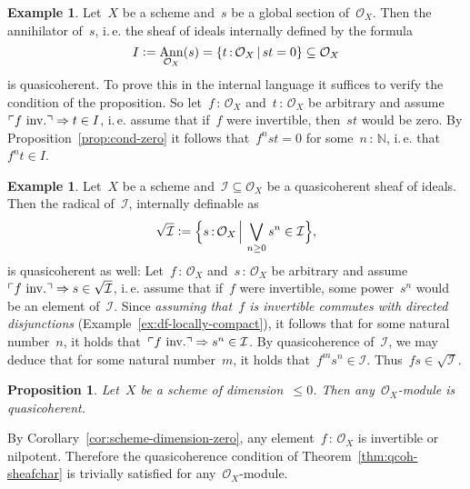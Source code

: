 \documentclass[10pt,reqno,a4paper]{amsbook}
\makeatletter
\theoremstyle{definition}
\newtheorem{ex}[defn]{Example}
\theoremstyle{plain}
\newtheorem{prop}[defn]{Proposition}
\theoremstyle{remark}
\newcommand{\A}{\mathcal{A}}
\renewcommand{\O}{\mathcal{O}}
\newcommand{\I}{\mathcal{I}}
\newcommand{\NN}{\mathbb{N}}
\DeclareMathOperator{\Ann}{Ann}
\newcommand{\?}{\,{:}\,}
\renewcommand{\_}{\mathpunct{.}\,}
\newcommand{\speak}[1]{\ulcorner\text{\textnormal{#1}}\urcorner}
\newcommand{\ie}{i.\,e.\@\xspace}
\newcommand{\inv}{inv.\@}
\newcommand{\defeq}{\vcentcolon=}
\renewenvironment{proof}[1][\proofname]{\par
  \pushQED{\qed}%
  \normalfont \topsep6\p@\@plus6\p@\relax
  \trivlist
  \item[\hskip\labelsep
        \itshape
    #1\@addpunct{.}]\ignorespaces
}{%
  \popQED\endtrivlist\@endpefalse
}
\makeatother
\begin{document}
\begin{ex}\label{ex:annihilator-qcoh}
Let~$X$ be a scheme and~$s$ be a global section of~$\O_X$. Then the
annihilator of~$s$, \ie the sheaf of ideals internally defined by the
formula
\[ I \defeq \Ann_{\O_X}(s) = \{ t\?\O_X \,|\, st = 0 \} \subseteq \O_X \]
is quasicoherent. To prove this in the internal language it suffices to
verify the condition of the proposition.
So let~$f\?\O_X$ and~$t\?\O_X$ be arbitrary and assume~$\speak{$f$ \inv} \Rightarrow t \in I$,
\ie assume that if~$f$ were invertible, then~$st$ would be zero. By
Proposition~\ref{prop:cond-zero} it follows that~$f^n st = 0$ for
some~$n\?\NN$, \ie that~$f^n t \in I$.
\end{ex}

\begin{ex}\label{ex:radical-qcoh} Let~$X$ be a scheme and~$\I \subseteq \O_X$
be a quasicoherent sheaf of ideals.  Then the radical of~$\I$, internally definable
as \[ \sqrt{\I} \defeq \Bigl\{ s\?\O_X \,\Big|\, \bigvee_{n \geq 0} s^n \in \I \Bigr\}, \] is
quasicoherent as well: Let~$f\?\O_X$ and~$s\?\O_X$ be arbitrary and
assume~$\speak{$f$ \inv} \Rightarrow s \in \sqrt{\I}$, \ie assume that if~$f$
were invertible, some power~$s^n$ would be an element of~$\I$. Since
\emph{assuming that~$f$ is invertible commutes with directed disjunctions}
(Example~\ref{ex:df-locally-compact}), it follows that for some natural
number~$n$, it holds that~$\speak{$f$ \inv} \Rightarrow s^n \in \I$. By
quasicoherence of~$\I$, we may deduce that for some natural number~$m$, it
holds that~$f^m s^n \in \I$. Thus~$fs \in \sqrt{\I}$.\end{ex}


\begin{prop}Let~$X$ be a scheme of dimension~$\leq 0$. Then any~$\O_X$-module
is quasicoherent.\end{prop}
\begin{proof}By Corollary~\ref{cor:scheme-dimension-zero}, any
element~$f\?\O_X$ is invertible or nilpotent. Therefore the quasicoherence
condition of Theorem~\ref{thm:qcoh-sheafchar} is trivially satisfied for any~$\O_X$-module.
\end{proof}
\end{document}
